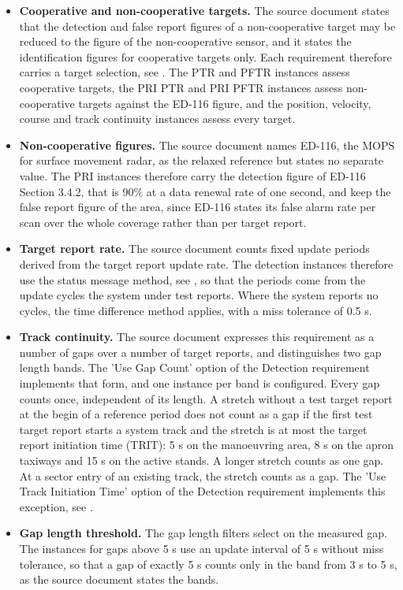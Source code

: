 \begin{itemize}
\item \textbf{Cooperative and non-cooperative targets.} The source document states that the detection and false report figures of a non-cooperative target may be reduced to the figure of the non-cooperative sensor, and it states the identification figures for cooperative targets only. Each requirement therefore carries a target selection, see . The PTR and PFTR instances assess cooperative targets, the PRI PTR and PRI PFTR instances assess non-cooperative targets against the ED-116 figure, and the position, velocity, course and track continuity instances assess every target.
\item \textbf{Non-cooperative figures.} The source document names ED-116, the MOPS for surface movement radar, as the relaxed reference but states no separate value. The PRI instances therefore carry the detection figure of ED-116 Section 3.4.2, that is 90\% at a data renewal rate of one second, and keep the false report figure of the area, since ED-116 states its false alarm rate per scan over the whole coverage rather than per target report.
\item \textbf{Target report rate.} The source document counts fixed update periods derived from the target report update rate. The detection instances therefore use the status message method, see , so that the periods come from the update cycles the system under test reports. Where the system reports no cycles, the time difference method applies, with a miss tolerance of 0.5 s.
\item \textbf{Track continuity.} The source document expresses this requirement as a number of gaps over a number of target reports, and distinguishes two gap length bands. The 'Use Gap Count' option of the Detection requirement implements that form, and one instance per band is configured. Every gap counts once, independent of its length. A stretch without a test target report at the begin of a reference period does not count as a gap if the first test target report starts a system track and the stretch is at most the target report initiation time (TRIT): 5 s on the manoeuvring area, 8 s on the apron taxiways and 15 s on the active stands. A longer stretch counts as one gap. At a sector entry of an existing track, the stretch counts as a gap. The 'Use Track Initiation Time' option of the Detection requirement implements this exception, see .
\item \textbf{Gap length threshold.} The gap length filters select on the measured gap. The instances for gaps above 5 s use an update interval of 5 s without miss tolerance, so that a gap of exactly 5 s counts only in the band from 3 s to 5 s, as the source document states the bands.

\end{itemize}

